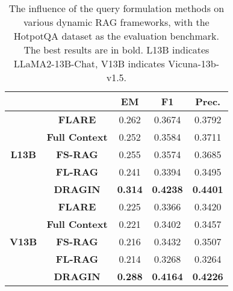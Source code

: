 \begin{table}[t]
\caption{The influence of the query formulation methods on various dynamic RAG frameworks, with the HotpotQA dataset as the evaluation benchmark. The best results are in bold. L13B indicates LLaMA2-13B-Chat, V13B indicates Vicuna-13b-v1.5.}
\label{tab:what}
\centering
\small
\setlength\tabcolsep{5pt} %
\begin{tabular}{ccccc}
\toprule
                               &                       & \textbf{EM} & \textbf{F1} & \textbf{Prec.} \\
                               \toprule
\multirow{5}{*}{\textbf{L13B}} & \textbf{FLARE}        & 0.262       & 0.3674      & 0.3792         \\
                               & \textbf{Full Context} & 0.252       & 0.3584      & 0.3711         \\
                               & \textbf{FS-RAG}       & 0.255       & 0.3574      & 0.3685         \\
                               & \textbf{FL-RAG}       & 0.241       & 0.3394      & 0.3495         \\
                               & \textbf{DRAGIN}       & \textbf{0.314}       & \textbf{0.4238}      & \textbf{0.4401}         \\
                               \midrule
\multirow{5}{*}{\textbf{V13B}} & \textbf{FLARE}        & 0.225       & 0.3366      & 0.3420          \\
                               & \textbf{Full Context} & 0.221       & 0.3402      & 0.3457         \\
                               & \textbf{FS-RAG}       & 0.216       & 0.3432      & 0.3507         \\
                               & \textbf{FL-RAG}       & 0.214       & 0.3268      & 0.3264         \\
                               & \textbf{DRAGIN}       & \textbf{0.288}       & \textbf{0.4164}     &\textbf{0.4226}        \\
                               \toprule
\end{tabular}
\end{table}

